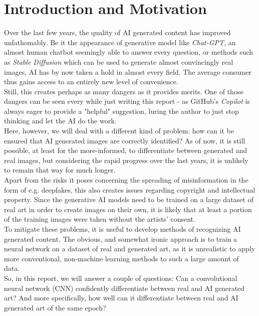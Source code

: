\chapter{Introduction and Motivation}
\label{ch:intro}
Over the last few years, the quality of AI generated content has improved unfathomably.
Be it the appearance of generative model like \textit{Chat-GPT}, an almost human chatbot seemingly able to answer every question,
or methods such as \textit{Stable Diffusion} which can be used to generate almost convincingly real images, 
AI has by now taken a hold in almost every field. 
The average consumer thus gains access to an entirely new level of convenience. \\

Still, this creates perhaps as many dangers as it provides merits.
One of those dangers can be seen every while just writing this report - as GitHub's \textit{Copilot} is always eager to provide a "helpful" suggestion,
luring the author to just stop thinking and let the AI do the work. \\

Here, however, we will deal with a different kind of problem: how can it be ensured that AI generated images are correctly identified?
As of now, it is still possible, at least for the more-informed, to differentiate between generated and real images, but considering the rapid progress over the last years,
it is unlikely to remain that way for much longer. \\ %

Apart from the risks it poses concerning the spreading of misinformation in the form of e.g. deepfakes, this also creates issues regarding copyright and intellectual property.
Since the generative AI models need to be trained on a large dataset of real art in order to create images on their own, it is likely that at least a portion of the training images
were taken without the artists' consent. \\

To mitigate these problems, it is useful to develop methods of recognizing AI generated content.
The obvious, and somewhat ironic approach is to train a neural network on a dataset of real and generated art, 
as it is unrealistic to apply more conventional, non-machine learning methods to such a large amount of data. \\

So, in this report, we will answer a couple of questions: Can a convolutional neural network (CNN) confidently differentiate between real and AI generated art?
And more specifically, how well can it differentiate between real and AI generated art of the same epoch? \\






